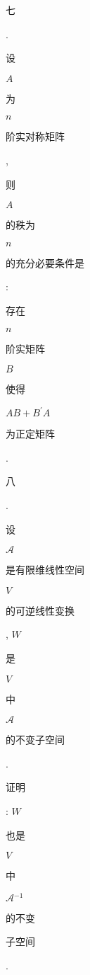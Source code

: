 \documentclass[10pt]{article}
\begin{document}
\begin{CJK}{UTF8}{mj}七\end{CJK}. \begin{CJK}{UTF8}{mj}设\end{CJK} $A$ \begin{CJK}{UTF8}{mj}为\end{CJK} $n$ \begin{CJK}{UTF8}{mj}阶实对称矩阵\end{CJK}, \begin{CJK}{UTF8}{mj}则\end{CJK} $A$ \begin{CJK}{UTF8}{mj}的秩为\end{CJK} $n$ \begin{CJK}{UTF8}{mj}的充分必要条件是\end{CJK}: \begin{CJK}{UTF8}{mj}存在\end{CJK} $n$ \begin{CJK}{UTF8}{mj}阶实矩阵\end{CJK} $B$ \begin{CJK}{UTF8}{mj}使得\end{CJK} $A B+B^{\prime} A$ \begin{CJK}{UTF8}{mj}为正定矩阵\end{CJK}. \begin{CJK}{UTF8}{mj}八\end{CJK}. \begin{CJK}{UTF8}{mj}设\end{CJK} $\mathscr{A}$ \begin{CJK}{UTF8}{mj}是有限维线性空间\end{CJK} $V$ \begin{CJK}{UTF8}{mj}的可逆线性变换\end{CJK}, $W$ \begin{CJK}{UTF8}{mj}是\end{CJK} $V$ \begin{CJK}{UTF8}{mj}中\end{CJK} $\mathscr{A}$ \begin{CJK}{UTF8}{mj}的不变子空间\end{CJK}. \begin{CJK}{UTF8}{mj}证明\end{CJK}: $W$ \begin{CJK}{UTF8}{mj}也是\end{CJK} $V$ \begin{CJK}{UTF8}{mj}中\end{CJK} $\mathscr{A}{ }^{-1}$ \begin{CJK}{UTF8}{mj}的不变\end{CJK} \begin{CJK}{UTF8}{mj}子空间\end{CJK}.
\end{document}
